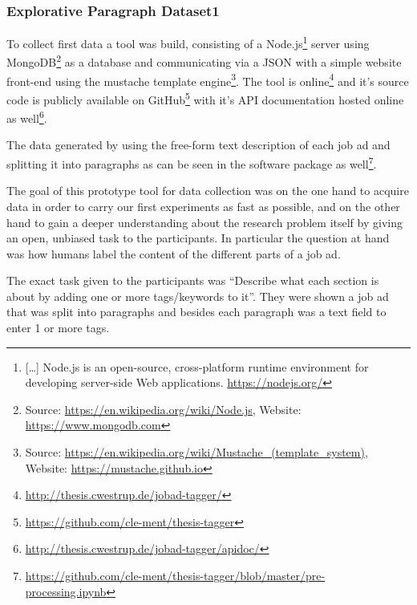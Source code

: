 \subsubsection{Explorative Paragraph Dataset1}


To collect first data a tool was build, consisting of a Node.js\footnote{[\ldots] Node.js is an open-source, cross-platform runtime environment for developing server-side Web applications. \url{https://nodejs.org/}} server using MongoDB\footnote{ Source: \url{https://en.wikipedia.org/wiki/Node.js}, Website: \url{https://www.mongodb.com}} as a database and communicating via a JSON with a simple website front-end using the mustache template engine\footnote{ Source: \url{https://en.wikipedia.org/wiki/Mustache_(template_system)}, Website: \url{https://mustache.github.io}}.
The tool is online\footnote{\url{http://thesis.cwestrup.de/jobad-tagger/}} and it's source code is publicly available on GitHub\footnote{\url{https://github.com/cle-ment/thesis-tagger}} with it's API documentation hosted online as well\footnote{\url{http://thesis.cwestrup.de/jobad-tagger/apidoc/}}.

The data generated by using the free-form text description of each job ad and splitting it into paragraphs as can be seen in the software package as well\footnote{\url{https://github.com/cle-ment/thesis-tagger/blob/master/pre-processing.ipynb}}.

The goal of this prototype tool for data collection was on the one hand to acquire data in order to carry our first experiments as fast as possible, and on the other hand to gain a deeper understanding about the research problem itself by giving an open, unbiased task to the participants. In particular the question at hand was how humans label the content of the different parts of a job ad.

The exact task given to the participants was ``Describe what each section is about by adding one or more tags/keywords to it''. They were shown a job ad that was split into paragraphs and besides each paragraph was a text field to enter 1 or more tags.

